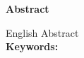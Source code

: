\centerline{\bfseries Abstract}
\linespread{1.4}
\thispagestyle{empty}%
English Abstract\\
\noindent\textbf{ Keywords:}